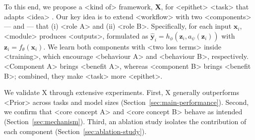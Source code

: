 To this end, we propose a <kind of> framework, \textbf{X}, for <epithet> <task> that adapts <idea> \cite{Placeholder-C}.
Our key idea is to extend <workflow> with two <components> ---  and  --- that (i) <role A> and (ii) <role B>.
Specifically, for each input $\mathbf{x}_i$, <module> produces <outputs>, formulated as $\hat{\mathbf{y}}_i = h_\phi(\mathbf{z}_i, a_\psi(\mathbf{z}_i))$ with $\mathbf{z}_i = f_\theta(\mathbf{x}_i)$.
We learn both components with <two loss terms> inside <training>, which encourage <behaviour A> and <behaviour B>, respectively.
<Component A> brings <benefit A>, whereas <component B> brings <benefit B>; combined, they make <task> more <epithet>.

We validate X through extensive experiments.
First, X generally outperforms <Prior> across tasks and model sizes (\cf Section~\ref{sec:main-performance}).
Second, we confirm that <core concept A> and <core concept B> behave as intended (\cf Section~\ref{sec:mechanism}).
Third, an ablation study isolates the contribution of each component (\cf Section~\ref{sec:ablation-study}).

